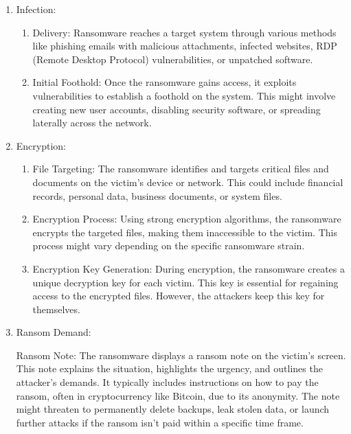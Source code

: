 \documentclass[12pt,letterpaper]{article}
\begin{document}
        \begin{enumerate}[label=\arabic*.]
        \item Infection:
    
        \begin{enumerate}[label=\alph*.]
            \item Delivery: Ransomware reaches a target system through various methods like phishing emails with malicious attachments, infected websites, RDP (Remote Desktop Protocol) vulnerabilities, or unpatched software.
    
            \item Initial Foothold: Once the ransomware gains access, it exploits vulnerabilities to establish a foothold on the system. This might involve creating new user accounts, disabling security software, or spreading laterally across the network.
            
        \end{enumerate}

        \item Encryption:
    
        \begin{enumerate}[label=\alph*.]
            \item File Targeting: The ransomware identifies and targets critical files and documents on the victim's device or network. This could include financial records, personal data, business documents, or system files.
    
            \item Encryption Process: Using strong encryption algorithms, the ransomware encrypts the targeted files, making them inaccessible to the victim. This process might vary depending on the specific ransomware strain.
    
            \item Encryption Key Generation: During encryption, the ransomware creates a unique decryption key for each victim. This key is essential for regaining access to the encrypted files. However, the attackers keep this key for themselves.
            
        \end{enumerate}
    
        \item Ransom Demand:
    
            Ransom Note: The ransomware displays a ransom note on the victim's screen. This note explains the situation, highlights the urgency, and outlines the attacker's demands. It typically includes instructions on how to pay the ransom, often in cryptocurrency like Bitcoin, due to its anonymity. The note might threaten to permanently delete backups, leak stolen data, or launch further attacks if the ransom isn't paid within a specific time frame.
    

\end{enumerate}
\end{document}
